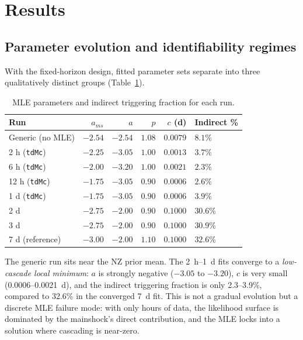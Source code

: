 \documentclass[12pt,letterpaper]{article}
\begin{document}
\section{Results}

\subsection{Parameter evolution and identifiability regimes}
\label{sec:params}

With the fixed-horizon design, fitted parameter sets separate into three
qualitatively distinct groups (Table~\ref{tab:params}).

\begin{table}[ht]
\centering
\small
\caption{MLE parameters and indirect triggering fraction for each run.}
\label{tab:params}
\begin{tabular}{lrrrrl}
\toprule
Run & $a_{ms}$ & $a$ & $p$ & $c$ (d) & Indirect \% \\
\midrule
Generic (no MLE) & $-2.54$ & $-2.54$ & $1.08$ & $0.0079$ & $8.1\%$ \\
2 h (\texttt{tdMc}) & $-2.25$ & $-3.05$ & $1.00$ & $0.0013$ & $3.7\%$ \\
6 h (\texttt{tdMc}) & $-2.00$ & $-3.20$ & $1.00$ & $0.0021$ & $2.3\%$ \\
12 h (\texttt{tdMc}) & $-1.75$ & $-3.05$ & $0.90$ & $0.0006$ & $2.6\%$ \\
1 d (\texttt{tdMc}) & $-1.75$ & $-3.05$ & $0.90$ & $0.0006$ & $3.9\%$ \\
2 d & $-2.75$ & $-2.00$ & $0.90$ & $0.1000$ & $30.6\%$ \\
3 d & $-2.75$ & $-2.00$ & $0.90$ & $0.1000$ & $30.9\%$ \\
7 d (reference) & $-3.00$ & $-2.00$ & $1.10$ & $0.1000$ & $32.6\%$ \\
\bottomrule
\end{tabular}
\end{table}

The generic run sits near the NZ prior mean. The 2~h--1~d fits converge to a
\emph{low-cascade local minimum}: $a$ is strongly negative ($-3.05$ to
$-3.20$), $c$ is very small (0.0006--0.0021~d), and the indirect triggering
fraction is only 2.3--3.9\%, compared to 32.6\% in the converged 7~d fit.
This is not a gradual evolution but a discrete MLE failure mode: with only
hours of data, the likelihood surface is dominated by the mainshock's direct
contribution, and the MLE locks into a solution where cascading is
near-zero.
\end{document}
